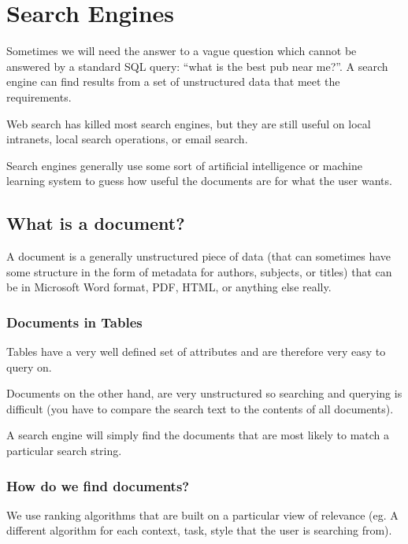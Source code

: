 \section{Search Engines}\label{sec:search_engines}

Sometimes we will need the answer to a vague question which cannot be answered by a standard SQL query: ``what is the best pub near me?''.
A search engine can find results from a set of unstructured data that meet the requirements.

Web search has killed most search engines, but they are still useful on local intranets, local search operations, or email search.

Search engines generally use some sort of artificial intelligence or machine learning system to guess how useful the documents are for what the user wants.

\subsection{What is a document?}\label{sub:what_is_a_document_}

A document is a generally unstructured piece of data (that can sometimes have some structure in the form of metadata for authors, subjects, or titles) that can be in Microsoft Word format, PDF, HTML, or anything else really.

\subsubsection{Documents in Tables}\label{ssub:documents_in_tables}

Tables have a very well defined set of attributes and are therefore very easy to query on.

Documents on the other hand, are very unstructured so searching and querying is difficult (you have to compare the search text to the contents of all documents).

A search engine will simply find the documents that are most likely to match a particular search string.

\subsubsection{How do we find documents?}\label{ssub:how_do_we_find_documents_}

We use ranking algorithms that are built on a particular view of relevance (eg. A different algorithm for each context, task, style that the user is searching from).

